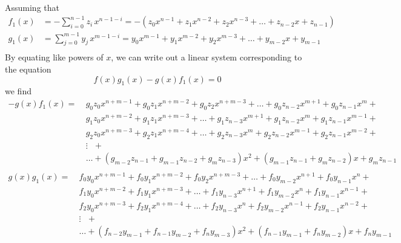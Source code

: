  Assuming that 
\begin{align*}
f_1(x)  &= -\sum_{i=0}^{n-1} z_i\,x^{n-1-i} = -(z_0 x^{n-1}  + z_1 x^{n-2}  + z_2 x^{n-3}  + \hdots  +z _{n-2} x + z_{n-1} ) \\
g_1(x) &= \sum_{j=0}^{m-1} y_j\,x^{m-1-i} =  y_0 x^{m-1} + y_1 x^{m-2} + y_2 x^{m-3} + \hdots  + y_{m-2} x + y_{m-1} \\
\end{align*}
By equating like powers of $x$, we can write out a linear system corresponding to the equation $$f(x) g_1(x) - g(x) f_1(x) = 0$$ we find 
\begin{align*}
-g(x) f_1(x)  = ~ &g_0 z_0 x^{n+m-1}  + g_0 z_1 x^{n+m-2}  + g_0 z_2 x^{n+m-3}  + \hdots  + g_0 z_{n-2} x^{m+1} + g_0  z_{n-1}x^m + \\
                      &g_1 z_0  x^{n+m-2}  + g_1 z_1 x^{n+m-3}  + \hdots  + g_1 z_{n-3} x^{m+1} + g_1 z_{n-2} x^{m} + g_1 z_{n-1} x^{m-1}  +\\
                      &g_2 z_0  x^{n+m-3}  + g_2 z_1 x^{n+m-4}  + \hdots  + g_2 z_{n-3} x^{m} + g_2 z_{n-2} x^{m-1} + g_2 z_{n-1} x^{m-2}  +\\
                      &\vdots  ~~~+ \\
                      &\hdots  + (g_{m-2} z_{n-1} + g_{m-1} z_{n-2} + g_{m} z_{n-3} ) x^{2} + (g_{m-1} z_{n-1}  +  g_m z_{n-2} )x + g_m z_{n-1}\\
\end{align*}
\begin{align*}
g(x) g_1(x)  = ~ &f_0 y_0 x^{n+m-1}  + f_0 y_1 x^{n+m-2}  + f_0 y_2 x^{n+m-3}  + \hdots  + f_0 y_{m-2} x^{n+1} + f_0  y_{n-1}x^n + \\
                      &f_1 y_0  x^{n+m-2}  + f_1 y_1 x^{n+m-3}  + \hdots  + f_1 y_{n-3} x^{n+1} + f_1 y_{m-2} x^{n} + f_1 y_{n-1} x^{n-1}  +\\
                      &f_2 y_0  x^{n+m-3}  + f_2 y_1 x^{n+m-4}  + \hdots  + f_2 y_{n-3} x^{n} + f_2 y_{m-2} x^{n-1} + f_2 y_{n-1} x^{n-2}  +\\
                      &\vdots  ~~~+ \\
                      &\hdots  + (f_{n-2} y_{m-1} + f_{n-1} y_{m-2} + f_{n} y_{m-3} ) x^{2} + (f_{n-1} y_{m-1}  +  f_n y_{m-2} )x + f_n y_{m-1}\\
\end{align*}

